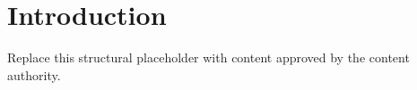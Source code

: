 \chapter{Introduction}

Replace this structural placeholder with content approved by the content
authority.
